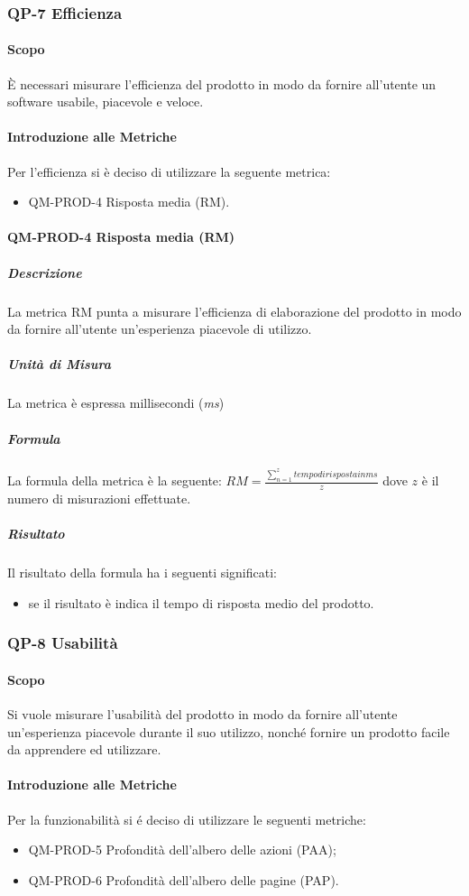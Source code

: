 	\subsubsection{QP-7 Efficienza}
		\paragraph{Scopo}
			È necessari misurare l'efficienza del prodotto in modo da fornire all'utente un software usabile, piacevole e veloce.
		\paragraph{Introduzione alle Metriche}
			Per l'efficienza si è deciso di utilizzare la seguente metrica:
			\begin{itemize}
				\item QM-PROD-4 Risposta media (RM).
			\end{itemize}
		\paragraph{QM-PROD-4 Risposta media (RM)}
			\subparagraph{Descrizione}
				La metrica RM punta a misurare l'efficienza di elaborazione del prodotto in modo da fornire all'utente un'esperienza piacevole di utilizzo.
			\subparagraph{Unità di Misura}
				La metrica è espressa millisecondi (\textit{ms})
			\subparagraph{Formula}
				La formula della metrica è la seguente:
				\(
					RM = \frac{\sum_{n=1}^{z} tempo di risposta in ms}{z}
				\)
				dove $z$ è il numero di misurazioni effettuate.
			\subparagraph{Risultato}
				Il risultato della formula ha i seguenti significati:
				\begin{itemize}
					\item se il risultato è indica il tempo di risposta medio del prodotto.
				\end{itemize}

	\subsubsection{QP-8 Usabilità}
		\paragraph{Scopo}
		Si vuole misurare l'usabilità del prodotto in modo da fornire all'utente un'esperienza piacevole durante il suo utilizzo, nonché fornire un prodotto facile da apprendere ed utilizzare.
		\paragraph{Introduzione alle Metriche}
			Per la funzionabilità si é deciso di utilizzare le seguenti metriche:
			\begin{itemize}
				\item QM-PROD-5 Profondità dell'albero delle azioni (PAA);
				\item QM-PROD-6 Profondità dell'albero delle pagine (PAP).
			\end{itemize}
